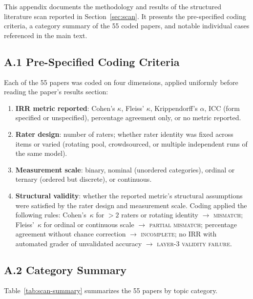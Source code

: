 \documentclass[preprint,12pt]{elsarticle}
\newcommand{\fk}{Fleiss'~$\kappa$}
\newcommand{\ck}{Cohen's~$\kappa$}
\begin{document}
This appendix documents the methodology and results of the structured literature scan
reported in Section~\ref{sec:scan}. It presents the pre-specified coding criteria, a
category summary of the 55 coded papers, and notable individual cases referenced in
the main text.

\subsection*{A.1 Pre-Specified Coding Criteria}

Each of the 55 papers was coded on four dimensions, applied uniformly before reading
the paper's results section:

\begin{enumerate}
  \item \textbf{IRR metric reported}: Cohen's $\kappa$, Fleiss' $\kappa$,
    Krippendorff's $\alpha$, ICC (form specified or unspecified), percentage agreement
    only, or no metric reported.
  \item \textbf{Rater design}: number of raters; whether rater identity was fixed
    across items or varied (rotating pool, crowdsourced, or multiple independent runs
    of the same model).
  \item \textbf{Measurement scale}: binary, nominal (unordered categories), ordinal
    or ternary (ordered but discrete), or continuous.
  \item \textbf{Structural validity}: whether the reported metric's structural
    assumptions were satisfied by the rater design and measurement scale. Coding
    applied the following rules: \ck{} for $> 2$ raters or rotating identity $\to$
    \textsc{mismatch}; \fk{} for ordinal or continuous scale $\to$ \textsc{partial
    mismatch}; percentage agreement without chance correction $\to$
    \textsc{incomplete}; no IRR with automated grader of unvalidated accuracy $\to$
    \textsc{layer-3 validity failure}.
\end{enumerate}

\subsection*{A.2 Category Summary}

Table~\ref{tab:scan-summary} summarizes the 55 papers by topic category.
\end{document}
